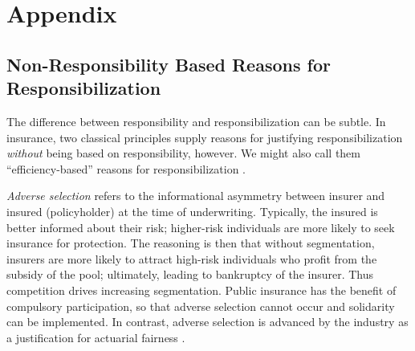 \documentclass[11pt]{article} %
\begin{document}







\appendix
\section{Appendix}
\subsection{Non-Responsibility Based Reasons for Responsibilization}
\label{sec:moralhazardadverse}
 The difference between responsibility and responsibilization can be subtle. In insurance, two classical principles supply reasons for justifying responsibilization \textit{without} being based on responsibility, however. We might also call them ``efficiency-based'' reasons for responsibilization \citep{andersen2015luck}.

\textit{Adverse selection} \citep{george1970market,thiery2006fairness,avraham2013understanding} refers to the informational asymmetry between insurer and insured (policyholder) at the time of underwriting. Typically, the insured is better informed about their risk; higher-risk individuals are more likely to seek insurance for protection. The reasoning is then that without segmentation, insurers are more likely to attract high-risk individuals who profit from the subsidy of the pool; ultimately, leading to bankruptcy of the insurer. Thus competition drives increasing segmentation. Public insurance has the benefit of compulsory participation, so that adverse selection cannot occur and solidarity can be implemented. In contrast, adverse selection is advanced by the industry as a justification for actuarial fairness \citep{miller2009disparate}.
\end{document}

